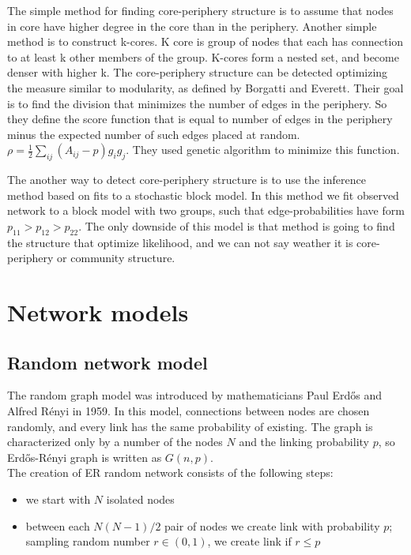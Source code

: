 The simple method for finding core-periphery structure is to assume that nodes in core have higher degree in the core than in the periphery. Another simple method is to construct k-cores. K core is group of nodes that each has connection to at least k other members of the group. K-cores form a nested set, and become denser with higher k. The core-periphery structure can be detected optimizing the measure similar to modularity, as defined by Borgatti and Everett. Their goal is to find the division that minimizes the number of edges in the periphery. So they define the score function that is equal to number of edges in the periphery minus the expected number of such edges placed at random. $\rho = \frac{1}{2}\sum_{ij}(A_{ij}-p)g_ig_j$. They used genetic algorithm to minimize this function. 

The another way to detect core-periphery structure is to use the inference method based on fits to a stochastic block model. In this method we fit observed network to a block model with two groups, such that edge-probabilities have form $p_{11}> p_{12} > p_{22}$. The only downside of this model is that method is going to find the structure that optimize likelihood, and we can not say weather it is core-periphery or community structure. 


\section{Network models}

\subsection{Random network model}

The random graph model was introduced by mathematicians Paul Erdős and Alfred R\' {e}nyi in 1959. In this model, connections between nodes are chosen randomly, and every link has the same probability of existing. The graph is characterized only by a number of the nodes $N$ and the linking probability $p$, so Erdős-R\' {e}nyi graph is written as $G(n, p)$. \\

The creation of ER random network consists of the following steps:
\begin{itemize}
	\item we start with $N$ isolated nodes
	\item between each $N(N-1)/2$ pair of nodes we create link with probability $p$; sampling random number $r \in (0,1)$, we create link if $r \leq p$    
\end{itemize}


